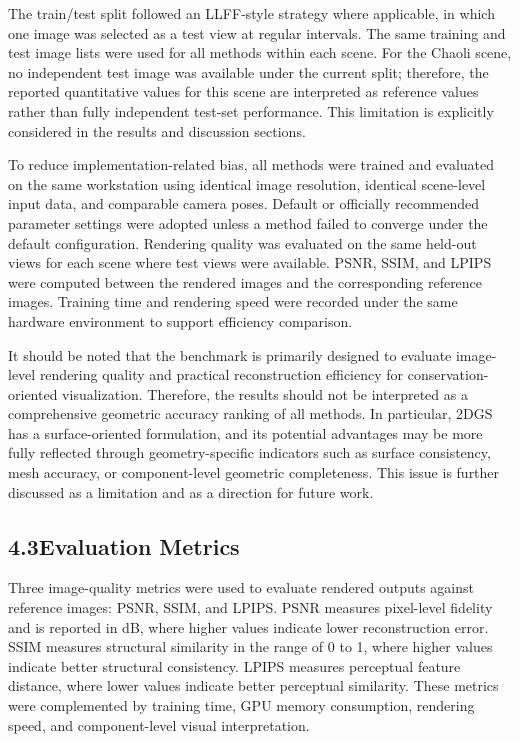 The train/test split followed an LLFF-style strategy where
applicable, in which one image was selected as a test view at regular
intervals. The same training and test image lists were used for all
methods within each scene. For the Chaoli scene, no independent test
image was available under the current split; therefore, the reported
quantitative values for this scene are interpreted as reference values
rather than fully independent test-set performance. This limitation is
explicitly considered in the results and discussion sections.

To reduce implementation-related bias, all methods were trained and
evaluated on the same workstation using identical image resolution,
identical scene-level input data, and comparable camera poses. Default
or officially recommended parameter settings were adopted unless a
method failed to converge under the default configuration. Rendering
quality was evaluated on the same held-out views for each scene where
test views were available. PSNR, SSIM, and LPIPS were computed between
the rendered images and the corresponding reference images. Training
time and rendering speed were recorded under the same hardware
environment to support efficiency comparison.

It should be noted that the benchmark is primarily designed to
evaluate image-level rendering quality and practical reconstruction
efficiency for conservation-oriented visualization. Therefore, the
results should not be interpreted as a comprehensive geometric accuracy
ranking of all methods. In particular, 2DGS has a surface-oriented
formulation, and its potential advantages may be more fully reflected
through geometry-specific indicators such as surface consistency, mesh
accuracy, or component-level geometric completeness. This issue is
further discussed as a limitation and as a direction for future work.

\subsection{4.3Evaluation
Metrics}\label{evaluation-metrics}

Three image-quality metrics were used to evaluate rendered outputs
against reference images: PSNR, SSIM, and LPIPS. PSNR measures
pixel-level fidelity and is reported in dB, where higher values indicate
lower reconstruction error. SSIM measures structural similarity in the
range of 0 to 1, where higher values indicate better structural
consistency. LPIPS measures perceptual feature distance, where lower
values indicate better perceptual similarity. These metrics were
complemented by training time, GPU memory consumption, rendering speed,
and component-level visual interpretation.

